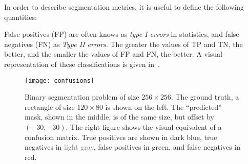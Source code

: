 In order to describe segmentation metrics, it is useful to define the following quantities:

\begin{center}
\end{center}

False positives (FP) are often knows as \textit{type I errors} in statistics, and false negatives (FN) as \textit{Type II errors}.
The greater the values of TP and TN, the better, and the smaller the values of FP and FN, the better.
A visual representation of these classifications is given in~.

\begin{figure}[htb]
  \texttt{[image: confusions]}
  \caption{
    Binary segmentation problem of size $256 \times 256$.
    The ground truth, a rectangle of size $120 \times 80$ is shown on the left.
    The \enquote{predicted} mask, shown in the middle, is of the same size, but offset by $(-30, -30)$.
    The right figure shows the visual equivalent of a confusion matrix.
    True positives are shown in \textcolor{tp}{dark blue}, true negatives in \textcolor{gray}{light gray}, false positives in \textcolor{fp}{green}, and false negatives in \textcolor{fn}{red}.
  }%
  \label{fig:confusions}
\end{figure}

